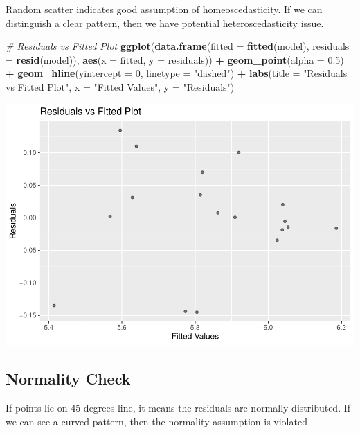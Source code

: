 \documentclass[
  12pt,
]{article}
\newenvironment{Shaded}{\begin{snugshade}}{\end{snugshade}}
\newcommand{\AttributeTok}[1]{\textcolor[rgb]{0.13,0.29,0.53}{#1}}
\newcommand{\CommentTok}[1]{\textcolor[rgb]{0.56,0.35,0.01}{\textit{#1}}}
\newcommand{\DecValTok}[1]{\textcolor[rgb]{0.00,0.00,0.81}{#1}}
\newcommand{\FloatTok}[1]{\textcolor[rgb]{0.00,0.00,0.81}{#1}}
\newcommand{\FunctionTok}[1]{\textcolor[rgb]{0.13,0.29,0.53}{\textbf{#1}}}
\newcommand{\NormalTok}[1]{#1}
\newcommand{\SpecialCharTok}[1]{\textcolor[rgb]{0.81,0.36,0.00}{\textbf{#1}}}
\newcommand{\StringTok}[1]{\textcolor[rgb]{0.31,0.60,0.02}{#1}}
\begin{document}
Random scatter indicates good assumption of homeoscedasticity. If we can
distinguish a clear pattern, then we have potential heteroscedasticity
issue.

\begin{Shaded}
\begin{Highlighting}[]
\CommentTok{\# Residuals vs Fitted Plot}
\FunctionTok{ggplot}\NormalTok{(}\FunctionTok{data.frame}\NormalTok{(}\AttributeTok{fitted =} \FunctionTok{fitted}\NormalTok{(model), }\AttributeTok{residuals =} \FunctionTok{resid}\NormalTok{(model)), }\FunctionTok{aes}\NormalTok{(}\AttributeTok{x =}\NormalTok{ fitted, }\AttributeTok{y =}\NormalTok{ residuals)) }\SpecialCharTok{+}
  \FunctionTok{geom\_point}\NormalTok{(}\AttributeTok{alpha =} \FloatTok{0.5}\NormalTok{) }\SpecialCharTok{+}
  \FunctionTok{geom\_hline}\NormalTok{(}\AttributeTok{yintercept =} \DecValTok{0}\NormalTok{, }\AttributeTok{linetype =} \StringTok{"dashed"}\NormalTok{) }\SpecialCharTok{+}
  \FunctionTok{labs}\NormalTok{(}\AttributeTok{title =} \StringTok{"Residuals vs Fitted Plot"}\NormalTok{, }\AttributeTok{x =} \StringTok{"Fitted Values"}\NormalTok{, }\AttributeTok{y =} \StringTok{"Residuals"}\NormalTok{)}
\end{Highlighting}
\end{Shaded}

\includegraphics{report1_r1_files/figure-latex/unnamed-chunk-18-1.pdf}

\subsection{Normality Check}\label{normality-check}

If points lie on 45 degrees line, it means the residuals are normally
distributed. If we can see a curved pattern, then the normality
assumption is violated
\end{document}
